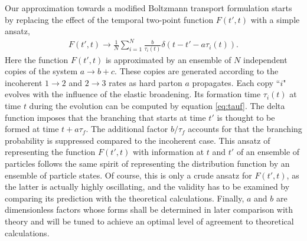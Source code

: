 \documentclass[aps, prc, reprint, amsmath, groupedaddress, nofootinbib]{revtex4-1}
\begin{document}
Our approximation towards a modified Boltzmann transport formulation starts by replacing the effect of the temporal two-point function $F(t',t)$ with a simple ansatz,
\begin{eqnarray}
F(t', t) \rightarrow \frac{1}{N}\sum_{i=1}^N \frac{b}{\tau_i(t)} \delta(t-t'- a \tau_i(t)).
\label{eq:ansatz}
\end{eqnarray}
Here the function $F(t', t)$ is approximated by an ensemble of $N$ independent copies of the system $a\rightarrow b+c$.
These copies are generated according to the incoherent $1\rightarrow 2$ and $2\rightarrow 3$ rates as hard parton $a$ propagates.
Each copy ``$i$" evolves with the influence of the elastic broadening. 
Its formation time $\tau_i(t)$ at time $t$ during the evolution can be computed by equation \ref{eq:tauf}.
The delta function imposes that the branching that starts at time $t'$  is thought to be formed at time $t+a\tau_f$.
The additional factor $b/\tau_f$ accounts for that the branching probability is suppressed compared to the incoherent case.
This ansatz of representing the function $F(t', t)$ with information at $t$ and $t'$ of an ensemble of particles follows the same spirit of representing the distribution function by an ensemble of particle states.
Of course, this is only a crude ansatz for $F(t', t)$, as the latter is actually highly oscillating, and the validity has to be examined by comparing its prediction with the theoretical calculations.
Finally, $a$ and $b$ are dimensionless factors whose forms shall be determined in later comparison with theory and will be tuned to achieve an optimal level of agreement to theoretical calculations.
\end{document}
